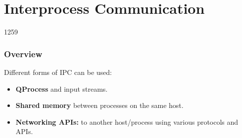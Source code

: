 \section{Interprocess Communication}

\begin{slide}{1259}
\label{inter-process-communication}
\frametitle{Overview}

Different forms of IPC can be used:

\begin{itemize}
\item \textbf{QProcess} and input streams.
\item \textbf{Shared memory} between processes on the same host.
\item \textbf{Networking APIs:} to another host/process using various protocols and APIs.
\end{itemize}
\end{slide}






